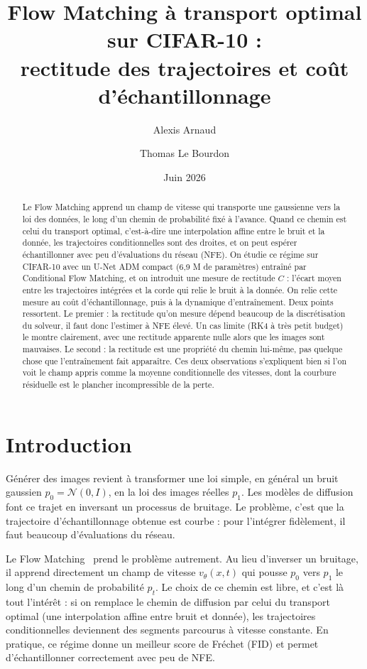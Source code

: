 \documentclass[11pt]{article}
\title{\textbf{Flow Matching à transport optimal sur CIFAR-10 :\\[2pt]
rectitude des trajectoires et coût d'échantillonnage}}
\author{Alexis Arnaud \and Thomas Le Bourdon}
\date{Juin 2026}
\begin{document}
\maketitle

\begin{abstract}
\noindent
Le Flow Matching apprend un champ de vitesse qui transporte une gaussienne vers la loi des données, le long
d'un chemin de probabilité fixé à l'avance. Quand ce chemin est celui du transport optimal, c'est-à-dire une
interpolation affine entre le bruit et la donnée, les trajectoires conditionnelles sont des droites, et on
peut espérer échantillonner avec peu d'évaluations du réseau (NFE). On étudie ce régime sur CIFAR-10 avec un
U-Net ADM compact (6,9 M de paramètres) entraîné par Conditional Flow Matching, et on introduit une mesure de
rectitude $C$ : l'écart moyen entre les trajectoires intégrées et la corde qui relie le bruit à la donnée. On
relie cette mesure au coût d'échantillonnage, puis à la dynamique d'entraînement. Deux points ressortent. Le
premier : la rectitude qu'on mesure dépend beaucoup de la discrétisation du solveur, il faut donc l'estimer à
NFE élevé. Un cas limite (RK4 à très petit budget) le montre clairement, avec une rectitude apparente nulle
alors que les images sont mauvaises. Le second : la rectitude est une propriété du chemin lui-même, pas
quelque chose que l'entraînement fait apparaître. Ces deux observations s'expliquent bien si l'on voit le
champ appris comme la moyenne conditionnelle des vitesses, dont la courbure résiduelle est le plancher
incompressible de la perte.
\end{abstract}

\section{Introduction}
\label{sec:intro}

Générer des images revient à transformer une loi simple, en général un bruit gaussien $p_0 = \mathcal{N}(0,
I)$, en la loi des images réelles $p_1$. Les modèles de diffusion~\cite{ho2020ddpm} font ce trajet en
inversant un processus de bruitage. Le problème, c'est que la trajectoire d'échantillonnage obtenue est
courbe : pour l'intégrer fidèlement, il faut beaucoup d'évaluations du réseau.

Le Flow Matching~\cite{lipman2023flow} prend le problème autrement. Au lieu d'inverser un bruitage, il
apprend directement un champ de vitesse $v_\theta(x, t)$ qui pousse $p_0$ vers $p_1$ le long d'un chemin de
probabilité $p_t$. Le choix de ce chemin est libre, et c'est là tout l'intérêt : si on remplace le chemin de
diffusion par celui du transport optimal (une interpolation affine entre bruit et donnée), les trajectoires
conditionnelles deviennent des segments parcourus à vitesse constante. En pratique, ce régime donne un
meilleur score de Fréchet (FID) et permet d'échantillonner correctement avec peu de NFE.
\end{document}
